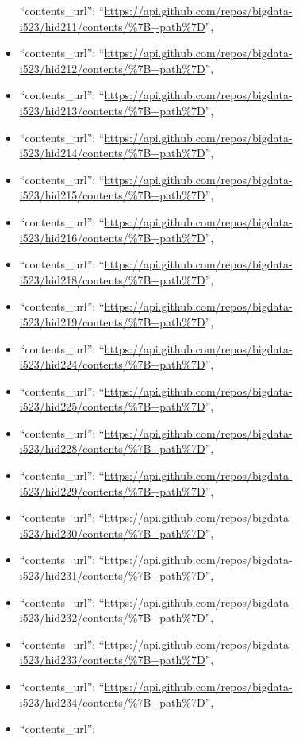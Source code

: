 \begin{itemize}
  ``contents\_url'':
  ``\url{https://api.github.com/repos/bigdata-i523/hid211/contents/\%7B+path\%7D}'',
\item
  ``contents\_url'':
  ``\url{https://api.github.com/repos/bigdata-i523/hid212/contents/\%7B+path\%7D}'',
\item
  ``contents\_url'':
  ``\url{https://api.github.com/repos/bigdata-i523/hid213/contents/\%7B+path\%7D}'',
\item
  ``contents\_url'':
  ``\url{https://api.github.com/repos/bigdata-i523/hid214/contents/\%7B+path\%7D}'',
\item
  ``contents\_url'':
  ``\url{https://api.github.com/repos/bigdata-i523/hid215/contents/\%7B+path\%7D}'',
\item
  ``contents\_url'':
  ``\url{https://api.github.com/repos/bigdata-i523/hid216/contents/\%7B+path\%7D}'',
\item
  ``contents\_url'':
  ``\url{https://api.github.com/repos/bigdata-i523/hid218/contents/\%7B+path\%7D}'',
\item
  ``contents\_url'':
  ``\url{https://api.github.com/repos/bigdata-i523/hid219/contents/\%7B+path\%7D}'',
\item
  ``contents\_url'':
  ``\url{https://api.github.com/repos/bigdata-i523/hid224/contents/\%7B+path\%7D}'',
\item
  ``contents\_url'':
  ``\url{https://api.github.com/repos/bigdata-i523/hid225/contents/\%7B+path\%7D}'',
\item
  ``contents\_url'':
  ``\url{https://api.github.com/repos/bigdata-i523/hid228/contents/\%7B+path\%7D}'',
\item
  ``contents\_url'':
  ``\url{https://api.github.com/repos/bigdata-i523/hid229/contents/\%7B+path\%7D}'',
\item
  ``contents\_url'':
  ``\url{https://api.github.com/repos/bigdata-i523/hid230/contents/\%7B+path\%7D}'',
\item
  ``contents\_url'':
  ``\url{https://api.github.com/repos/bigdata-i523/hid231/contents/\%7B+path\%7D}'',
\item
  ``contents\_url'':
  ``\url{https://api.github.com/repos/bigdata-i523/hid232/contents/\%7B+path\%7D}'',
\item
  ``contents\_url'':
  ``\url{https://api.github.com/repos/bigdata-i523/hid233/contents/\%7B+path\%7D}'',
\item
  ``contents\_url'':
  ``\url{https://api.github.com/repos/bigdata-i523/hid234/contents/\%7B+path\%7D}'',
\item
  ``contents\_url'':

\end{itemize}
